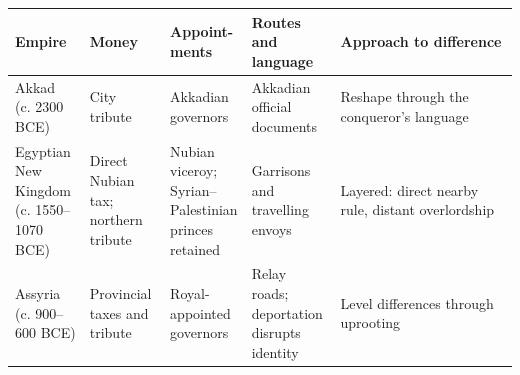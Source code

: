 \noindent
\begin{tabularx}{\linewidth}{llllX}
\toprule
Empire & Money & \shortstack[l]{Appoint-\\ments} & \shortstack[l]{Routes and\\language} & Approach to difference \\
\midrule
\shortstack[l]{Akkad\\(c. 2300\\BCE)} & \shortstack[l]{City\\tribute} & \shortstack[l]{Akkadian\\governors} & \shortstack[l]{Akkadian\\official\\documents} & Reshape through the conqueror's language \\
\shortstack[l]{Egyptian\\New\\Kingdom\\(c. 1550--\\1070 BCE)} & \shortstack[l]{Direct\\Nubian tax;\\northern\\tribute} & \shortstack[l]{Nubian\\viceroy;\\Syrian--\\Palestinian\\princes\\retained} & \shortstack[l]{Garrisons\\and\\travelling\\envoys} & Layered: direct nearby rule, distant overlordship \\
\shortstack[l]{Assyria\\(c. 900--\\600 BCE)} & \shortstack[l]{Provincial\\taxes and\\tribute} & \shortstack[l]{Royal-\\appointed\\governors} & \shortstack[l]{Relay roads;\\deportation\\disrupts\\identity} & Level differences through uprooting \\
\bottomrule
\end{tabularx}

